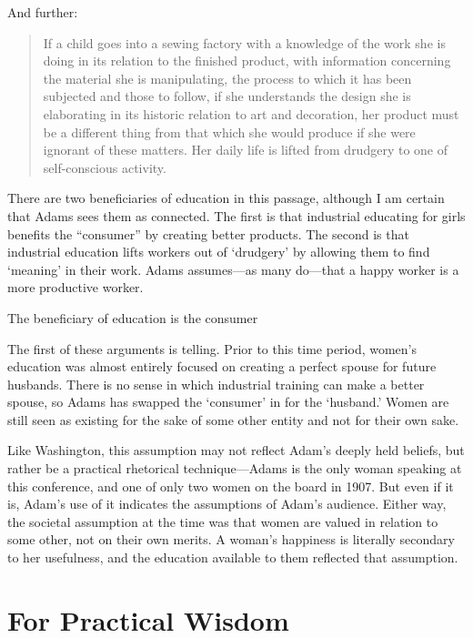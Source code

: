 And further:

\begin{quote}

If a child goes into a sewing factory with a knowledge of the work she is doing in its relation to the finished product, with information concerning the material she is manipulating, the process to which it has been subjected and those to follow, if she understands the design she is elaborating in its historic relation to art and decoration, her product must be a different thing from that which she would produce if she were ignorant of these matters. Her daily life is lifted from drudgery to one of self-conscious activity. ~\citep[p.42--43]{Adams:1907ux}
\end{quote}

There are two beneficiaries of education in this passage, although I am certain that Adams sees them as connected. The first is that industrial educating for girls benefits the ``consumer'' by creating better products. The second is that industrial education lifts workers out of `drudgery' by allowing them to find `meaning' in their work. Adams assumes---as many do---that a happy worker is a more productive worker.\begin{objects}
\label{adamsobjects}The beneficiary of education is the consumer
\end{objects}
 

The first of these arguments is telling. Prior to this time period, women's education was almost entirely focused on creating a perfect spouse for future husbands. There is no sense in which industrial training can make a better spouse, so Adams has swapped the `consumer' in for the `husband.' Women are still seen as existing for the sake of some other entity and not for their own sake. 

Like Washington, this assumption may not reflect Adam's deeply held beliefs, but rather be a practical rhetorical technique---Adams is the only woman speaking at this conference, and one of only two women on the board in 1907. But even if it is, Adam's use of it indicates the assumptions of Adam's audience. Either way, the societal assumption at the time was that women are valued in relation to some other, not on their own merits. A woman's happiness is literally secondary to her usefulness, and the education available to them reflected that assumption.

\section{For Practical Wisdom}
\label{forpracticalwisdom}

